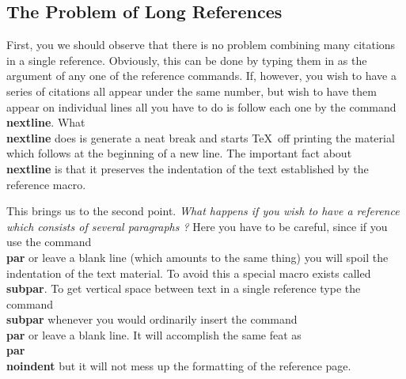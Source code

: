 \subsection{The Problem of Long References }
 
First, you we should observe that there is no problem combining
many citations in a single reference.
Obviously, this can be done by typing them in as the argument
of any one of the reference commands.
If, however, you wish to have a series of citations all appear
under the same number, but wish to have them appear on
individual lines all you have to do is follow each one by the
command {\bf \\nextline}.
What {\bf \\nextline} does is generate a neat break and starts
\TeX\ off printing the material which follows at the beginning of
a new line.
The important fact about {\bf \\nextline} is that it preserves
the indentation of the text established by the reference macro.
 
This brings us to the second point.
{\it What happens if you wish to have a reference which consists
of several paragraphs ?\/}
Here you have to be careful, since if you use the command {\bf \\par}
or leave a blank line (which amounts to the same thing)
you will spoil the indentation of the text material.
To avoid this a special macro exists called {\bf \\subpar}.
To get vertical space between text in a single reference
type the command {\bf \\subpar}
whenever you would ordinarily insert
the command {\bf \\par} or leave a blank line.
It will accomplish the same feat as {\bf \\par \\noindent}
but it will not mess up the formatting of the reference page.
 
